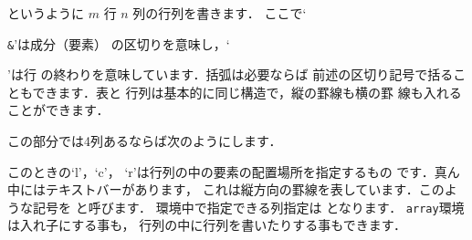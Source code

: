 というように $m$ 行 $n$ 列の行列を書きます．
%
%
ここで`{\texttt\&'は成分（要素）
の区切りを意味し，`{\texttt{\BS\BS}'は行
の終わりを意味しています．括弧は必要ならば
前述の区切り記号で括ることもできます．表と
行列は基本的に同じ構造で，縦の罫線も横の罫
線も入れることができます．


この部分では4列あるならば次のようにします．


このときの`{\str l}'，`{\str c}'，
`{\str r}'は行列の中の要素の配置場所を指定するもの
です．真ん中にはテキストバー\qu{\texttt |}があります，
これは縦方向の罫線を表しています．このような記号を
{}と呼びます．
%
環境中で指定できる列指定は
となります．
\texttt{array}環境は入れ子にする事も，
行列の中に行列を書いたりする事もできます．

}}
